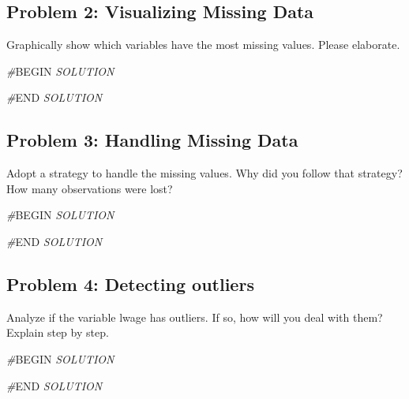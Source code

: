 \documentclass[
]{article}
\newenvironment{Shaded}{\begin{snugshade}}{\end{snugshade}}
\newcommand{\CommentTok}[1]{\textcolor[rgb]{0.56,0.35,0.01}{\textit{#1}}}
\newcommand{\RegionMarkerTok}[1]{#1}
\begin{document}
\hypertarget{problem-2-visualizing-missing-data}{%
\subsection{Problem 2: Visualizing Missing
Data}\label{problem-2-visualizing-missing-data}}

Graphically show which variables have the most missing values. Please
elaborate.

\begin{Shaded}
\begin{Highlighting}[]
\CommentTok{\#}\RegionMarkerTok{BEGIN}\CommentTok{ SOLUTION}

\CommentTok{\#}\RegionMarkerTok{END}\CommentTok{ SOLUTION}
\end{Highlighting}
\end{Shaded}

\hypertarget{problem-3-handling-missing-data}{%
\subsection{Problem 3: Handling Missing
Data}\label{problem-3-handling-missing-data}}

Adopt a strategy to handle the missing values. Why did you follow that
strategy? How many observations were lost?

\begin{Shaded}
\begin{Highlighting}[]
\CommentTok{\#}\RegionMarkerTok{BEGIN}\CommentTok{ SOLUTION}

\CommentTok{\#}\RegionMarkerTok{END}\CommentTok{ SOLUTION}
\end{Highlighting}
\end{Shaded}

\hypertarget{problem-4-detecting-outliers}{%
\subsection{Problem 4: Detecting
outliers}\label{problem-4-detecting-outliers}}

Analyze if the variable lwage has outliers. If so, how will you deal
with them? Explain step by step.

\begin{Shaded}
\begin{Highlighting}[]
\CommentTok{\#}\RegionMarkerTok{BEGIN}\CommentTok{ SOLUTION}


\CommentTok{\#}\RegionMarkerTok{END}\CommentTok{ SOLUTION}
\end{Highlighting}
\end{Shaded}
\end{document}
